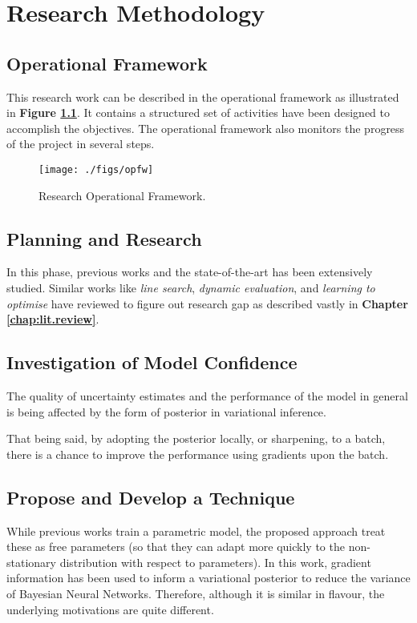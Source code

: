 \chapter{Research Methodology}
\label{chap:method}

\section{Operational Framework}
This research work can be described in the operational framework as illustrated in \textbf{Figure \ref{fig:opfw}}. It contains a structured set of activities have been designed to accomplish the objectives. The operational framework also monitors the progress of the project in several steps.

\begin{figure}
	\centering
	\texttt{[image: ./figs/opfw]}
	\caption[Research Operational Framework]{Research Operational Framework.}
	\label{fig:opfw}
\end{figure}

\section{Planning and Research}
In this phase, previous works and the state-of-the-art has been extensively studied. Similar works like \textit{line search}, \textit{dynamic evaluation}, and \textit{learning to optimise} have reviewed to figure out research gap as described vastly in \textbf{Chapter \ref{chap:lit.review}}.

\section{Investigation of Model Confidence}
The quality of uncertainty estimates and the performance of the model in general is being affected by the form of posterior in variational inference.

That being said, by adopting the posterior locally, or sharpening, to a batch, there is a chance to improve the performance using gradients upon the batch.

\section{Propose and Develop a Technique}
While previous works train a parametric model, the proposed approach treat these as free parameters (so that they can adapt more quickly to the non-stationary distribution with respect to parameters). In this work, gradient information has been used to inform a variational posterior to reduce the variance of Bayesian Neural Networks. Therefore, although it is similar in flavour, the underlying motivations are quite different.

